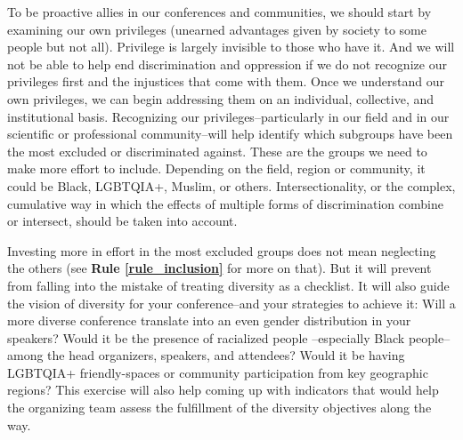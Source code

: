 \documentclass[10pt,letterpaper]{article}
\begin{document}
To be proactive allies in our conferences and communities, we should start by examining our own privileges (unearned advantages given by society to some people but not all).
Privilege is largely invisible to those who have it. And we will not be able to help end discrimination and oppression if we do not recognize our privileges first and the injustices that come with them.
Once we understand our own privileges, we can begin addressing them on an individual, collective, and institutional basis.
Recognizing our privileges--particularly in our field and in our scientific or professional community--will help identify which subgroups have been the most excluded or discriminated against. 
These are the groups we need to make more effort to include. 
Depending on the field, region or community, it could be Black, LGBTQIA+, Muslim, or others. 
Intersectionality, or the complex, cumulative way in which the effects of multiple forms of discrimination combine or intersect, should be taken into account. 

Investing more in effort in the most excluded groups does not mean neglecting the others (see \textbf{Rule \ref{rule_inclusion}} for more on that). 
But it will prevent from falling into the mistake of treating diversity as a checklist.
It will also guide the vision of diversity for your conference--and your strategies to achieve it:
Will a more diverse conference translate into an even gender distribution in your speakers? 
Would it be the presence of racialized people --especially Black people-- among the head organizers, speakers, and attendees? 
Would it be having LGBTQIA+ friendly-spaces or community participation from key geographic regions?
This exercise will also help coming up with indicators that would help the organizing team assess the fulfillment of the diversity objectives along the way. 

\end{document}
